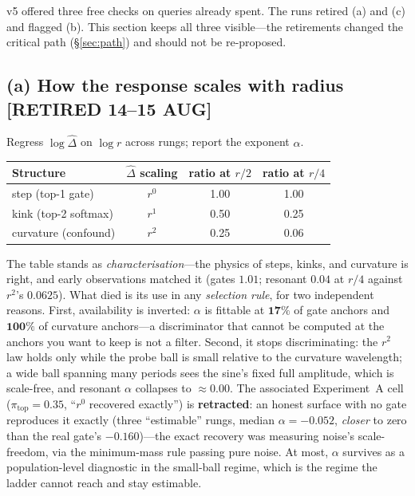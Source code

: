\documentclass[11pt]{article}
\newcommand{\Dhat}{\hat{\Delta}}
\newcommand{\provtag}[2]{{\footnotesize\sffamily\textcolor{#1}{[#2]}}}
\newcommand{\RETIRED}{\provtag{limred}{RETIRED 14--15 AUG}}
\begin{document}
v5 offered three free checks on queries already spent. The runs retired (a) and (c) and flagged
(b). This section keeps all three visible---the retirements changed the critical path
(\S\ref{sec:path}) and should not be re-proposed.

\subsection*{(a) How the response scales with radius \textnormal{\RETIRED}}

Regress $\log\Dhat$ on $\log r$ across rungs; report the exponent $\alpha$.

\begin{table}[h]
\small\centering
\begin{tabular}{@{}lccc@{}}
\toprule
\textbf{\sffamily Structure} & $\Dhat$ \textbf{\sffamily scaling}
  & \textbf{\sffamily ratio at} $r/2$ & \textbf{\sffamily ratio at} $r/4$\\
\midrule
step (top-1 gate)      & $r^0$ & 1.00 & 1.00\\
kink (top-2 softmax)   & $r^1$ & 0.50 & 0.25\\
curvature (confound)   & $r^2$ & 0.25 & 0.06\\
\bottomrule
\end{tabular}
\end{table}

\noindent The table stands as \emph{characterisation}---the physics of steps, kinks, and
curvature is right, and early observations matched it (gates $1.01$; resonant $0.04$ at $r/4$
against $r^2$'s $0.0625$). What died is its use in any \emph{selection rule}, for two
independent reasons. First, availability is inverted: $\alpha$ is fittable at $\mathbf{17\%}$ of
gate anchors and $\mathbf{100\%}$ of curvature anchors---a discriminator that cannot be computed
at the anchors you want to keep is not a filter. Second, it stops discriminating: the $r^2$ law
holds only while the probe ball is small relative to the curvature wavelength; a wide ball
spanning many periods sees the sine's fixed full amplitude, which is scale-free, and resonant
$\alpha$ collapses to ${\approx}0.00$. The associated Experiment~A cell ($\pi_{\mathrm{top}} =
0.35$, ``$r^0$ recovered exactly'') is \textbf{retracted}: an honest surface with no gate
reproduces it exactly (three ``estimable'' rungs, median $\alpha = -0.052$, \emph{closer} to
zero than the real gate's $-0.160$)---the exact recovery was measuring noise's scale-freedom,
via the minimum-mass rule passing pure noise. At most, $\alpha$ survives as a population-level
diagnostic in the small-ball regime, which is the regime the ladder cannot reach and stay
estimable.
\end{document}

